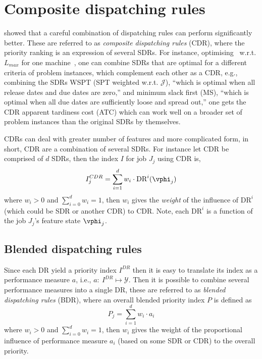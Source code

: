 \section{Composite dispatching rules}\label{sec:CDR}
\citet{Jayamohan04} showed that a careful combination of dispatching rules can perform significantly better. These are referred to as \emph{composite dispatching rules} (CDR), where the priority ranking is an expression of several SDRs. For instance, optimising \JSP\ w.r.t. $L_{max}$ for one machine\ \cite[see. chapter 14.2]{Pinedo08}, one can combine SDRs that are optimal for a different criteria of problem instances, which complement each other as a CDR, e.g., combining the SDRs 
WSPT (SPT weighted w.r.t. $\mathcal{J}$), ``which is optimal when all release dates and due dates are zero,'' 
and minimum slack first (MS), ``which is optimal when all due dates are sufficiently loose and spread out,'' 
one gets the CDR apparent tardiness cost (ATC) which can work well on a broader set of problem instances than the original SDRs by themselves.

CDRs can deal with greater number of features and more complicated form, in short, CDR are a combination of several SDRs. For instance let CDR be comprised of $d$ SDRs, then the index $I$ for job $J_j$ using CDR is, 
\begin{equation}
I_j^{CDR} = \sum_{i=1}^d w_i \cdot \text{DR}^i(\vphi_j)
\end{equation}
where $w_i>0$ and $\sum_{i=0}^d w_i = 1$, then $w_i$ gives the \emph{weight} of the influence of $\text{DR}^i$ (which could be SDR or another CDR) to CDR. Note, each $\text{DR}^i$ is a function of the job $J_j$'s feature state $\vphi_j$.

\subsection{Blended dispatching rules}
Since each DR yield a priority index $I^{DR}$ then it is easy to translate its index as a  performance measure $a$, i.e., $a:~I^{DR}\mapsto \mathcal{Y}$. Then it is possible to combine several performance measures into a single DR, these are referred to as \emph{blended dispatching rules} (BDR), where an overall blended priority index $P$ is defined as 
\begin{equation}
P_j = \sum_{i=1}^d w_i \cdot a_i 
\end{equation}
where $w_i>0$ and $\sum_{i=0}^d w_i = 1$, then $w_i$ gives the weight of the proportional influence of performance measure $a_i$ (based on some SDR or CDR) to the overall priority. 

